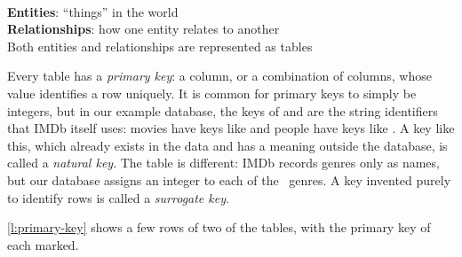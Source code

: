 \begin{frame}
    \\[1em]
    \textbf{Entities}: ``things'' in the world\\
    \textbf{Relationships}: how one entity relates to another\\[1em]
    Both entities and relationships are represented as tables
\end{frame}
\label{l:moviedb-tables}

Every table has a \emph{primary key}: a column, or a combination of columns, whose value identifies a row uniquely.
It is common for primary keys to simply be integers, but in our example database, the keys of  and  are the string identifiers that IMDb itself uses: movies have keys like  and people have keys like .
A key like this, which already exists in the data and has a meaning outside the database, is called a \emph{natural key}.
The  table is different: IMDb records genres only as names, but our database assigns an integer  to each of the \dbrowsgenres\ genres.
A key invented purely to identify rows is called a \emph{surrogate key}.

\autoref{l:primary-key} shows a few rows of two of the tables, with the primary key of each marked.

